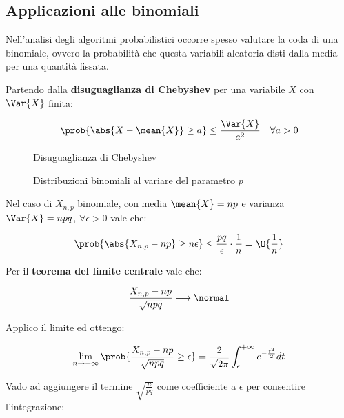 \documentclass[\main/main.tex]{subfiles}
\begin{document}
\subsection{Applicazioni alle binomiali}
Nell'analisi degli algoritmi probabilistici occorre spesso valutare la coda di una binomiale, ovvero la probabilità che questa variabili aleatoria disti dalla media per una quantità fissata.

Partendo dalla \textbf{disuguaglianza di Chebyshev} per una variabile \(X\) con \(\Var{X}\) finita:

\begin{figure}
  \[
    \prob{\abs{X-\mean{X}} \geq a} \leq \frac{\Var{X}}{a^2} \quad \forall a > 0
  \]
  \caption{Disuguaglianza di Chebyshev}
\end{figure}

\begin{figure}
  \caption{Distribuzioni binomiali al variare del parametro \(p\)}
\end{figure}

Nel caso di \(X_{n,p}\) binomiale, con media \(\mean{X} = np\) e varianza \(\Var{X} = npq\), \(\forall \epsilon > 0\) vale che:

\[
  \prob{\abs{X_{n,p} - np} \geq n\epsilon} \leq \frac{pq}{\epsilon}\cdot \frac{1}{n} = \O{\frac{1}{n}}
\]

Per il \textbf{teorema del limite centrale} vale che:

\[
  \frac{X_{n,p} - np}{\sqrt{npq}} \longrightarrow \normal
\]

Applico il limite ed ottengo:

\[
  \lim_{n\rightarrow+\infty} \prob{\frac{X_{n,p} - np}{\sqrt{npq}}\geq \epsilon} = \frac{2}{\sqrt{2\pi}} \int_{\epsilon}^{+\infty} e^{-\frac{t^2}{2}} dt
\]

Vado ad aggiungere il termine \(\sqrt{\frac{n}{pq}}\) come coefficiente a \(\epsilon \) per consentire l'integrazione:
\end{document}
